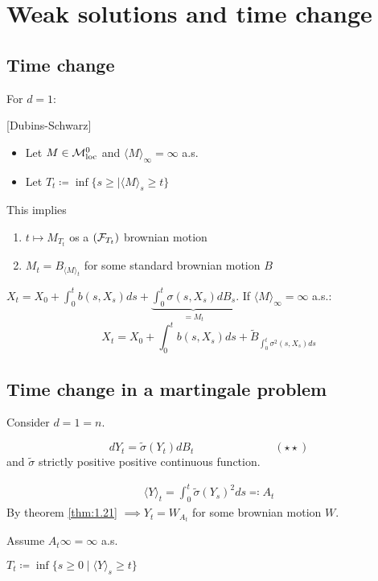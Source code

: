 \section{Weak solutions and time change}

\subsection{Time change}

For $d=1$:

\begin{theorem}\label{thm:1.21}[Dubins-Schwarz]
    \begin{itemize}
        \item Let $M\in\mathcal{M}_{\text{loc}}^0$ and $\langle M\rangle_\infty=\infty$ a.s. 
        \item Let $T_t\coloneqq \inf\{s\geq |\langle M\rangle_s \geq t\}$
    \end{itemize}
    This implies    
    \begin{enumerate}
        \item $t\mapsto M_{T_t}$ os a $(\mathcal{F}_{T_t})$ brownian motion
        \item $M_t=B_{\langle M\rangle_t}$ for some standard brownian motion $B$
    \end{enumerate}
\end{theorem}

$X_t=X_0+\int_0^t b(s,X_s)ds+\underbrace{\int_0^t \sigma(s,X_s)dB_s}_{=M_t}$.
If $\langle M\rangle_\infty=\infty$ a.s.:
\[X_t=X_0+\int_0^tb(s,X_s)ds+\tilde{B}_{\int_0^t \sigma^2(s,X_s)ds}\]

\subsection{Time change in a martingale problem}

Consider $d=1=n$.

\[dY_t=\tilde{\sigma}(Y_t)dB_t \hspace{3cm}(\star\star)\]
and $\tilde{\sigma}$ strictly positive positive continuous function.

\begin{align*}
    \langle Y\rangle_t=\int_0^t\tilde{\sigma}(Y_s)^2 ds\eqqcolon A_t
\end{align*}
By theorem \ref{thm:1.21} $\implies Y_t=W_{A_t}$ for some brownian motion $W$.

Assume $A_t\infty=\infty$ a.s.

$T_t\coloneqq \inf\{s\geq 0\mid \langle Y\rangle_s \geq t\}$

